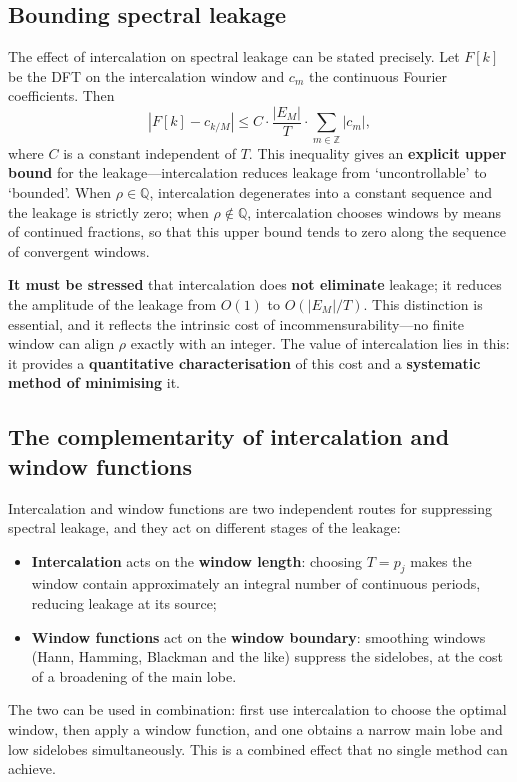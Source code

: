\subsection*{Bounding spectral leakage}

The effect of intercalation on spectral leakage can be stated precisely. Let $F[k]$ be the DFT on the intercalation window and $c_m$ the continuous Fourier coefficients. Then
\[
\left| F[k] - c_{k/M} \right| \le C \cdot \frac{|E_M|}{T} \cdot \sum_{m\in\mathbb{Z}} |c_m|,
\]
where $C$ is a constant independent of $T$. This inequality gives an \textbf{explicit upper bound} for the leakage---intercalation reduces leakage from `uncontrollable' to `bounded'. When $\rho \in \mathbb{Q}$, intercalation degenerates into a constant sequence and the leakage is strictly zero; when $\rho \notin \mathbb{Q}$, intercalation chooses windows by means of continued fractions, so that this upper bound tends to zero along the sequence of convergent windows.

\textbf{It must be stressed} that intercalation does \textbf{not eliminate} leakage; it reduces the amplitude of the leakage from $O(1)$ to $O(|E_M|/T)$. This distinction is essential, and it reflects the intrinsic cost of incommensurability---no finite window can align $\rho$ exactly with an integer. The value of intercalation lies in this: it provides a \textbf{quantitative characterisation} of this cost and a \textbf{systematic method of minimising} it.

\subsection*{The complementarity of intercalation and window functions}

Intercalation and window functions are two independent routes for suppressing spectral leakage, and they act on different stages of the leakage:
\begin{itemize}[leftmargin=2em]
    \item \textbf{Intercalation} acts on the \textbf{window length}: choosing $T = p_j$ makes the window contain approximately an integral number of continuous periods, reducing leakage at its source;
    \item \textbf{Window functions} act on the \textbf{window boundary}: smoothing windows (Hann, Hamming, Blackman and the like) suppress the sidelobes, at the cost of a broadening of the main lobe.
\end{itemize}
The two can be used in combination: first use intercalation to choose the optimal window, then apply a window function, and one obtains a narrow main lobe and low sidelobes simultaneously. This is a combined effect that no single method can achieve.

